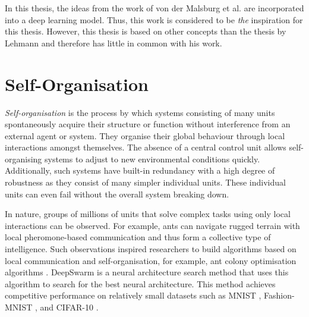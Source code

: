 In this thesis, the ideas from the work of von der Malsburg et al. \cite{von_der_Malsburg_Stadelmann_Grewe_2022} are incorporated into a deep learning model.
Thus, this work is considered to be \emph{the} inspiration for this thesis.
However, this thesis is based on other concepts than the thesis by Lehmann \cite{lehmann} and therefore has little in common with his work.



\section{Self-Organisation}
\emph{Self-organisation} is the process by which systems consisting of many units spontaneously acquire their structure or function without interference from an external agent or system.
They organise their global behaviour through local interactions amongst themselves.
The absence of a central control unit allows self-organising systems to adjust to new environmental conditions quickly.
Additionally, such systems have built-in redundancy with a high degree of robustness as they consist of many simpler individual units.
These individual units can even fail without the overall system breaking down.

In nature, groups of millions of units that solve complex tasks using only local interactions can be observed.
For example, ants can navigate rugged terrain with local pheromone-based communication and thus form a collective type of intelligence.
Such observations inspired researchers to build algorithms based on local communication and self-organisation, for example, ant colony optimisation algorithms .
DeepSwarm  is a neural architecture search method that uses this algorithm to search for the best neural architecture.
This method achieves competitive performance on relatively small datasets such as MNIST \cite{Lecun_Bottou_Bengio_Haffner_1998}, Fashion-MNIST \cite{xiao2017/online}, and CIFAR-10 \cite{krizhevsky2009learning}.

